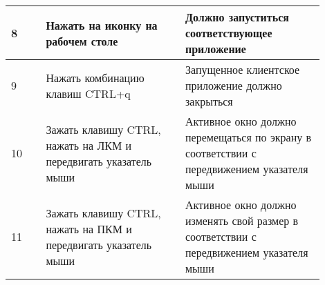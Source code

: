\documentclass[10pt,a4paper]{report}
\begin{document}
\begin{table}[H]
\begin{center}
\begin{tabular}{| p{0.1\linewidth} | p{0.4\linewidth} | p{0.4\linewidth} |}
\hline
8 & Нажать на иконку на рабочем столе & Должно запуститься соответствующее приложение\\
\hline
9 & Нажать комбинацию клавиш CTRL+q & Запущенное клиентское приложение должно закрыться\\
\hline
10 & Зажать клавишу CTRL, нажать на ЛКМ и передвигать указатель мыши & Активное окно должно перемещаться по экрану в соответствии с передвижением указателя мыши\\
\hline
11 & Зажать клавишу CTRL, нажать на ПКМ и передвигать указатель мыши & Активное окно должно изменять свой размер в соответствии с передвижением указателя мыши\\
\hline
\end{tabular}
\end{center}
\end{table}
		
\end{document}
